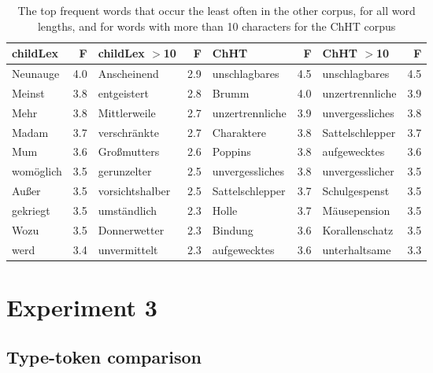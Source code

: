 \documentclass[doc, a4paper, anonymous]{apa7}
\begin{document}
\begin{table}[!htbp]
\caption{The top frequent words that occur the least often in the other corpus, for all word lengths, and for words with more than 10 characters for the ChHT corpus}
\centering
\begin{tabular}{lrlrlrlr}
  \hline
childLex & F & childLex $>$10 & F & ChHT & F & ChHT $>$10 & F \\ 
  \hline
Neunauge & 4.0 & Anscheinend & 2.9 & unschlagbares & 4.5 & unschlagbares & 4.5 \\ 
  Meinst & 3.8 & entgeistert & 2.8 & Brumm & 4.0 & unzertrennliche & 3.9 \\ 
  Mehr & 3.8 & Mittlerweile & 2.7 & unzertrennliche & 3.9 & unvergessliches & 3.8 \\ 
  Madam & 3.7 & verschränkte & 2.7 & Charaktere & 3.8 & Sattelschlepper & 3.7 \\ 
  Mum & 3.6 & Großmutters & 2.6 & Poppins & 3.8 & aufgewecktes & 3.6 \\ 
  womöglich & 3.5 & gerunzelter & 2.5 & unvergessliches & 3.8 & unvergesslicher & 3.5 \\ 
  Außer & 3.5 & vorsichtshalber & 2.5 & Sattelschlepper & 3.7 & Schulgespenst & 3.5 \\ 
  gekriegt & 3.5 & umständlich & 2.3 & Holle & 3.7 & Mäusepension & 3.5 \\ 
  Wozu & 3.5 & Donnerwetter & 2.3 & Bindung & 3.6 & Korallenschatz & 3.5 \\ 
  werd & 3.4 & unvermittelt & 2.3 & aufgewecktes & 3.6 & unterhaltsame & 3.3 \\ 
   \hline
\end{tabular}
\label{words-chht-low}
\end{table}

\clearpage

\section{Experiment 3}

\subsection{Type-token comparison}
\end{document}
